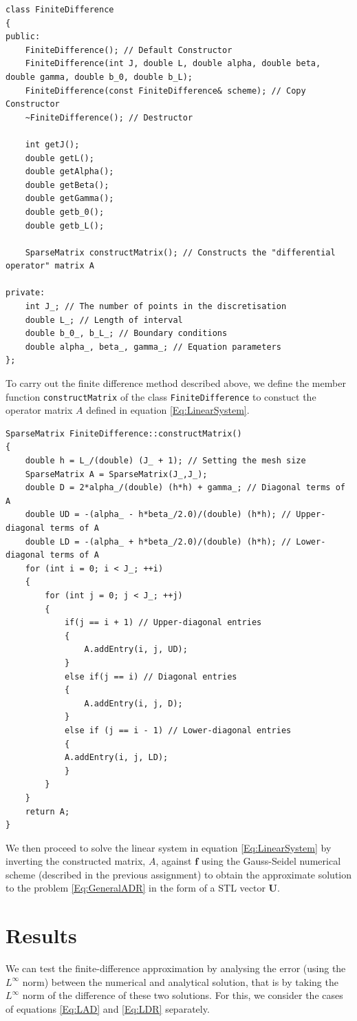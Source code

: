 \documentclass[a4paper,11pt]{article}
\theoremstyle{break}
\theoremstyle{break2}
\theoremstyle{break}
\theoremstyle{break2}
\begin{document}
\begin{lstlisting}
class FiniteDifference
{
public:
	FiniteDifference(); // Default Constructor
	FiniteDifference(int J, double L, double alpha, double beta, double gamma, double b_0, double b_L);
	FiniteDifference(const FiniteDifference& scheme); // Copy Constructor
	~FiniteDifference(); // Destructor

	int getJ();
	double getL();
	double getAlpha();
	double getBeta();
	double getGamma();
	double getb_0();
	double getb_L();

	SparseMatrix constructMatrix(); // Constructs the "differential operator" matrix A

private:
	int J_; // The number of points in the discretisation
	double L_; // Length of interval
	double b_0_, b_L_; // Boundary conditions
	double alpha_, beta_, gamma_; // Equation parameters
};
\end{lstlisting}
To carry out the finite difference method described above, we define the member function \texttt{constructMatrix} of the class \texttt{FiniteDifference} to constuct the operator matrix $ A $ defined in equation \eqref{Eq:LinearSystem}.
\begin{lstlisting}
SparseMatrix FiniteDifference::constructMatrix()
{
	double h = L_/(double) (J_ + 1); // Setting the mesh size
	SparseMatrix A = SparseMatrix(J_,J_);
	double D = 2*alpha_/(double) (h*h) + gamma_; // Diagonal terms of A
	double UD = -(alpha_ - h*beta_/2.0)/(double) (h*h); // Upper-diagonal terms of A
	double LD = -(alpha_ + h*beta_/2.0)/(double) (h*h); // Lower-diagonal terms of A
	for (int i = 0; i < J_; ++i)
	{
		for (int j = 0; j < J_; ++j)
		{
			if(j == i + 1) // Upper-diagonal entries
			{
				A.addEntry(i, j, UD);
			}
			else if(j == i) // Diagonal entries
			{
				A.addEntry(i, j, D);
			}
			else if (j == i - 1) // Lower-diagonal entries
			{
			A.addEntry(i, j, LD);
			}
		}
	}
	return A;
}
\end{lstlisting} 
We then proceed to solve the linear system in equation \eqref{Eq:LinearSystem} by inverting the constructed matrix, $ A $, against $ \mathbf{f} $ using the Gauss-Seidel numerical scheme (described in the previous assignment) to obtain the approximate solution to the problem \eqref{Eq:GeneralADR} in the form of a STL vector $ \mathbf{U} $.
\section{Results}
We can test the finite-difference approximation by analysing the error (using the $ L^{\infty} $ norm) between the numerical and analytical solution, that is by taking the $ L^{\infty} $ norm of the difference of these two solutions. For this, we consider the cases of equations \eqref{Eq:LAD} and \eqref{Eq:LDR} separately.
\end{document}
